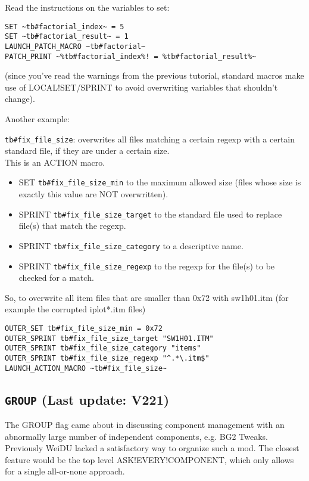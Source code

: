 \documentclass{article}
\def\DEFINE#1{{\tt \bf #1}\label{#1}\index{#1}}
\begin{document}
Read the instructions on the variables to set:
\begin{verbatim}
SET ~tb#factorial_index~ = 5
SET ~tb#factorial_result~ = 1
LAUNCH_PATCH_MACRO ~tb#factorial~
PATCH_PRINT ~%tb#factorial_index%! = %tb#factorial_result%~
\end{verbatim}
(since you've read the warnings from the previous tutorial, standard macros
make use of LOCAL!SET/SPRINT to avoid overwriting variables that shouldn't
change).

Another example:

\verb+tb#fix_file_size+: overwrites all files matching a certain regexp with a
certain standard file, if they are under a certain size. \\
This is an ACTION macro.
\begin{itemize}
\item SET \verb+tb#fix_file_size_min+ to the maximum allowed size
(files whose size is exactly this value are NOT overwritten).
\item SPRINT \verb+tb#fix_file_size_target+ to the standard file used to replace file(s) that match the regexp.
\item SPRINT \verb+tb#fix_file_size_category+ to a descriptive name.
\item SPRINT \verb+tb#fix_file_size_regexp+ to the regexp for the file(s) to be checked for a match.
\end{itemize}
So, to overwrite all item files that are smaller than 0x72 with sw1h01.itm
(for example the corrupted iplot*.itm files)
\begin{verbatim}
OUTER_SET tb#fix_file_size_min = 0x72
OUTER_SPRINT tb#fix_file_size_target "SW1H01.ITM"
OUTER_SPRINT tb#fix_file_size_category "items"
OUTER_SPRINT tb#fix_file_size_regexp "^.*\.itm$"
LAUNCH_ACTION_MACRO ~tb#fix_file_size~
\end{verbatim}

\subsection{\DEFINE{GROUP} (Last update: V221)}

The GROUP flag came about in discussing component management with an
abnormally large number of independent components, e.g. BG2 Tweaks. Previously
WeiDU lacked a satisfactory way to organize such a mod. The closest feature
would be the top level ASK!EVERY!COMPONENT, which only allows for a single
all-or-none approach.
\end{document}
